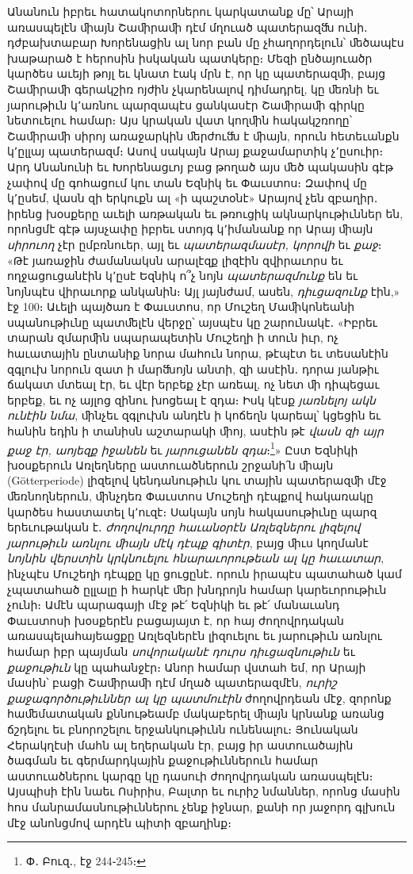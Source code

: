 \documentclass{article}
\begin{document}
{Անանուն իբրեւ հատակոտորներու կարկատանք մը՝ Արայի առասպելէն ﬕայն Շաﬕրաﬕ դէմ մղուած պատերազﬓ ունի․ դժբախտաբար Խորենացին ալ նոր բան մը չհաղորդելուն՝ ﬔծապէս խաթարած է հերոսին իսկական պատկերը։ Մեզի ընծայուածր կարծես աւեյի թոյլ եւ կնատ էակ մրն է, որ կը պատերազﬕ, բայց Շաﬕրաﬕ գերակշիռ ոյժին չկարենալով դիմադրել, կը ﬔռնի եւ յարութիւն կ՚առնու պարզապէս ցանկասէր Շաﬕրաﬕ գիրկը նետուելու համար։ Այս կրական վատ կողﬕն հակակշռողը՝ Շաﬕրաﬕ սիրոյ առաջարկին ﬔրժուﬓ է ﬕայն, որուն հետեւանքն կ՚ըլլայ պատերազմ։ Ասով սակայն Արայ քաջամարտիկ չ՚ըսուիր։ Արդ Անանունի եւ Խորենացւոյ բաց թողած այս ﬔծ պակասին գէթ չափով մը գոհացում կու տան Եզնիկ եւ Փաւստոս։ Զափով մը կ՚ըսեմ, վասն զի երկուքն ալ «ի պաշտօնէ» Արայով չեն զբաղիր․ իրենց խօսքերը աւելի առթական եւ թռուցիկ ակնարկութիւններ են, որոնցմէ գէթ այսչափը իբրեւ ստոյգ կ՚իմանանք որ Արայ ﬕայն \emph{սիրուող} չէր ըմբռնուեր, այլ եւ \emph{պատերազմասէր, կորովի} եւ \emph{քաջ}։ «Թէ յառաջին ժամանակսն արալէզք լիզէին զվիրաւորս եւ ողջացուցանէին կ՚ըսէ Եզնիկ ո՞չ նոյն \emph{պատերազմունք} են եւ նոյնպէս վիրաւորք անկանին։ Այլ յայնժամ, ասեն, \emph{դիւցազունք} էին,» էջ 100։ Աւելի պայծառ է Փաւստոս, որ Մուշեղ Մաﬕկոնեանի սպանութիւնը պատﬔլէն վերջը՝ այսպէս կը շարունակէ․ «Իբրեւ տարան զմարﬕն սպարապետին Մուշեղի ի տուն իւր, ոչ հաւատային ընտանիք նորա մահուն նորա, թէպէտ եւ տեսանէին զգլուխ նորուն զատ ի մարﬓոյն անտի, զի ասէին․ դորա յանթիւ ճակատ մտեալ էր, եւ վէր երբեք չէր առեալ, ոչ նետ ﬕ դիպեցաւ երբեք, եւ ոչ այլոց զինու խոցեալ է զդա։ Իսկ կէսք \emph{յառնելոյ ակն ունէին նմա}, ﬕնչեւ զգլուխն անդէն ի կոճեղն կարեալ՝ կցեցին եւ հանին եդին ի տանիսն աշտարակի ﬕոյ, ասէին թէ \emph{վասն զի այր քաջ էր, աոյեզք իջանեն} եւ \emph{յարուցանեն զդա}։\footnote{Փ․ Բուզ․, էջ 244֊245։}» Ըստ Եզնիկի խօսքերուն Առլեղները աստուածներուն շրջանի՛ն ﬕայն (Götterperiode) լիզելով կենդանութիւն կու տային պատերազﬕ մէջ ﬔռնողներուն, ﬕնչդեռ Փաւստոս Մուշեղի դէպքով հակառակը կարծես հաստատել կ՚ուզէ։ Սակայն սոյն հակասութիւնը պարզ երեւութական է․ \emph{ժողովուրդը հաւանօրէն Առլեզներու լիզելով յարութիւն առնլու ﬕայն մէկ դէպք գիտէր}, բայց ﬕւս կողմանէ \emph{նոյնին վերստին կրկնուելու հնարաւորութեան ալ կը հաւատար}, ինչպէս Մուշեղի դէպքը կը ցուցընէ․ որուն իրապէս պատահած կամ չպատահած ըլլալը ի հարկէ ﬔր խնդրոյն համար կարեւորութիւն չունի։ Ամէն պարագայի մէջ թէ՛ Եզնիկի եւ թէ՛ մանաւանդ Փաւստոսի խօսքերէն բացայայտ է, որ հայ ժողովրդական առասպելահայեացքը Առլեզներէն լիզուելու եւ յարութիւն առնլու համար իբր պայման \emph{սովորականէ դուրս դիւցազնութիւն} եւ \emph{քաջութիւն} կը պահանջէր։ Անոր համար վստահ եմ, որ Արայի մասին՝ բացի Շաﬕրաﬕ դէմ մղած պատերազմէն, \emph{ուրիշ քաջագործութիւններ ալ կը պատմուէին} ժողովրդեան մէջ, զորոնք հաﬔմատական քննութեամբ մակաբերել ﬕայն կրնանք առանց ճշդելու եւ բնորոշելու երջանկութիւնն ունենալու։ Յունական Հերակղէսի մահն ալ եղերական էր, բայց իր աստուածային ծագման եւ գերմարդկային քաջութիւններուն համար աստուածներու կարգը կը դասուի ժողովրդական առասպելէն։ Այսպիսի էին նաեւ Ոսիրիս, Բալտր եւ ուրիշ նմաններ, որոնց մասին հոս մանրամասնութիւններու չենք իջնար, քանի որ յաջորդ գլխուն մէջ անոնցմով արդէն պիտի զբաղինք։

}
\end{document}
